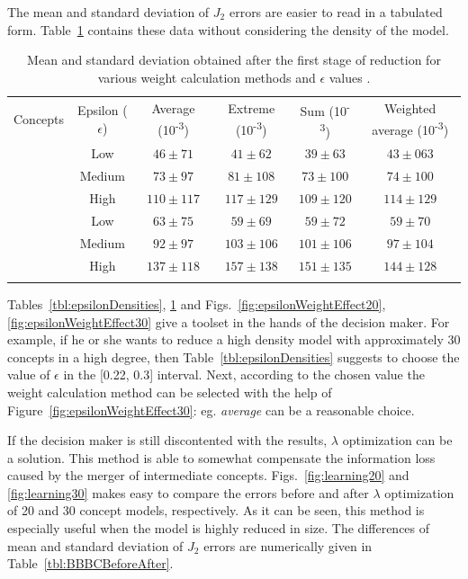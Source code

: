 \documentclass[graybox]{svmult}
\begin{document}
The mean and standard deviation of $J_2$ errors are easier to read in 
a tabulated form. Table~\ref{tbl:meanStddevWeightEpsilon} contains 
these data without considering the density of the model.

\begin{table}[!t]
  \caption{Mean and standard deviation obtained after the first stage of reduction for various weight calculation methods and 
$\epsilon$ values \cite{hatwagner2018two}.}
  \label{tbl:meanStddevWeightEpsilon}
  \centering
  \begin{tabular}{cccccc}
    \hline\noalign{\smallskip}
    Concepts & Epsilon ($\epsilon$) & Average 
(10\textsuperscript{-3}) & Extreme (10\textsuperscript{-3}) & Sum 
(10\textsuperscript{-3}) & Weighted average 
(10\textsuperscript{-3}) \\
    \noalign{\smallskip}\svhline\noalign{\smallskip}
    \multirow{3}{*}{20} & Low & $46 \pm 71$ & $41 \pm 62$ & $39 \pm 63$ 
    & $43 \pm 063$ \\
    & Medium & $73 \pm 97$ & $81 \pm 108$ & $73 \pm 100$ & $74 \pm 100$ 
    \\
    & High & $110 \pm 117$ & $117 \pm 129$ & $109 \pm 120$ & $114 \pm 
    129$ \\
    \noalign{\smallskip}\hline\noalign{\smallskip}
    \multirow{3}{*}{30} & Low & $63 \pm 75$ & $59 \pm 69$ & $59 \pm 72$ 
    & $59 \pm 70$ \\
    & Medium & $92 \pm 97$ & $103 \pm 106$ & $101 \pm 106$ & $97 \pm 
    104$ \\
    & High & $137 \pm 118$ & $157 \pm 138$ & $151 \pm 135$ & $144 \pm 
    128$ \\
    \noalign{\smallskip}\hline\noalign{\smallskip}
  \end{tabular}
\end{table}

Tables~\ref{tbl:epsilonDensities}, \ref{tbl:meanStddevWeightEpsilon} and 
Figs.~\ref{fig:epsilonWeightEffect20}, \ref{fig:epsilonWeightEffect30} give 
a toolset in the hands of the decision maker. For example, if he or she 
wants to reduce a high density model with approximately 30 concepts in a high 
degree, then Table~\ref{tbl:epsilonDensities} suggests to choose the 
value of $\epsilon$ in the [0.22, 0.3] interval. Next, according to the 
chosen value the weight calculation method can be selected with the 
help of Figure~\ref{fig:epsilonWeightEffect30}: eg. \emph{average} can be a 
reasonable choice.

If the decision maker is still discontented with the results, $\lambda$ 
optimization can be a solution. This method is able to somewhat 
compensate the information loss caused by the merger of intermediate 
concepts. Figs.~\ref{fig:learning20} and \ref{fig:learning30} makes easy 
to compare the errors before and after $\lambda$ optimization of 20 and 
30 concept models, respectively. As it can be seen, this method is 
especially useful when the model is highly reduced in size. The 
differences of mean and standard deviation of $J_2$ errors are 
numerically given in Table~\ref{tbl:BBBCBeforeAfter}.
\end{document}
